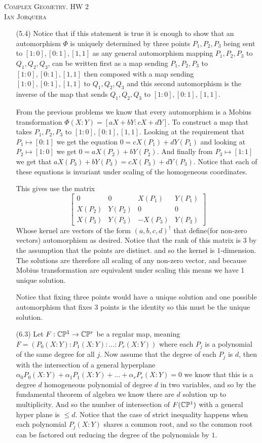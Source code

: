 \documentclass[12pt]{amsart}
\begin{document}
\begin{center}
    \textsc{Complex Geometry. HW 2\\ Ian Jorquera}
\end{center}
\vspace{1em}
\begin{itemize}
\item[(5.4)] Notice that if this statement is true it is enough to show that an automorphism $\Phi$ is uniquely 
determined by three points $P_1,P_2,P_3$ being sent to $[1:0],[0:1],[1,1]$ as any general automorphism mapping
$P_1,P_2,P_3$ to $Q_1,Q_2,Q_3$, can be written first as a map sending $P_1,P_2,P_3$ to $[1:0],[0:1],[1,1]$ then 
composed with a map sending $[1:0],[0:1],[1,1]$ to $Q_1,Q_2,Q_3$ and this second automorphism is the inverse of 
the map that sends $Q_1,Q_2,Q_3$ to $[1:0],[0:1],[1,1]$.

From the previous problems we know that every automorphism is a Mobius transformation $\Phi(X:Y)=[aX+bY:cX+dY]$.
To construct a map that takes $P_1,P_2,P_3$ to $[1:0],[0:1],[1,1]$. Looking at the requirement that $P_1\mapsto[0:1]$
we get the equation $0=cX(P_1)+dY(P_1)$ and looking at $P_2\mapsto[1:0]$ we get $0=aX(P_2)+bY(P_2)$. And finally
from $P_3\mapsto[1:1]$ we get that $aX(P_3)+bY(P_3)=cX(P_3)+dY(P_3)$. Notice that each of these equations is invariant 
under scaling of the homogeneous coordinates.

This gives use the matrix 
\[\begin{bmatrix}
    0&0&X(P_1)&Y(P_1)\\
    X(P_2)&Y(P_2)&0&0\\
    X(P_3)&Y(P_3)&-X(P_3)&Y(P_3)
\end{bmatrix}\]
Whose kernel are vectors of the form $(a,b,c,d)^\dagger$ that define(for non-zero vectors) automorphism as desired.
Notice that the rank of this matrix is $3$ by the assumption that the points are distinct. and so the kernel is 
$1$-dimension. The solutions are therefore all scaling of any non-zero vector, and because Mobius transformation 
are equivalent under scaling this means we have 1 unique solution.

Notice that fixing three points would have a unique solution and one possible automorphism that fixes 3 points is the
 identity so this must be the unique solution.\\


 \item[(6.3)] Let $F:\mathbb{C}\mathbb{P}^1\rightarrow \mathbb{C}\mathbb{P}^r$ be a regular map, meaning $F=(P_0(X:Y):P_1(X:Y):\dots:P_r(X:Y))$ where each 
 $P_j$ is a polynomial of the same degree for all $j$.
 Now assume that the degree of each $P_j$ is $d$, then with the intersection of a general hyperplane 
 $\alpha_0P_0(X:Y)+\alpha_1P_1(X:Y)+\dots+\alpha_rP_r(X:Y)=0$ we know that this is a degree $d$ homogeneous 
 polynomial of degree $d$ in two variables, and so by the fundamental theorem of 
 algebra we know there are $d$ solution up to multiplicity.
 And so the number of intersection of $F(\mathbb{C}\mathbb{P}^1)$ with a general hyper plane is $\leq d$.
 Notice that the case of strict inequality happens when each polynomial $P_j(X:Y)$ shares a 
 common root, and so the common root can be factored out reducing the degree of the polynomials by $1$.
\end{itemize}
\end{document}
